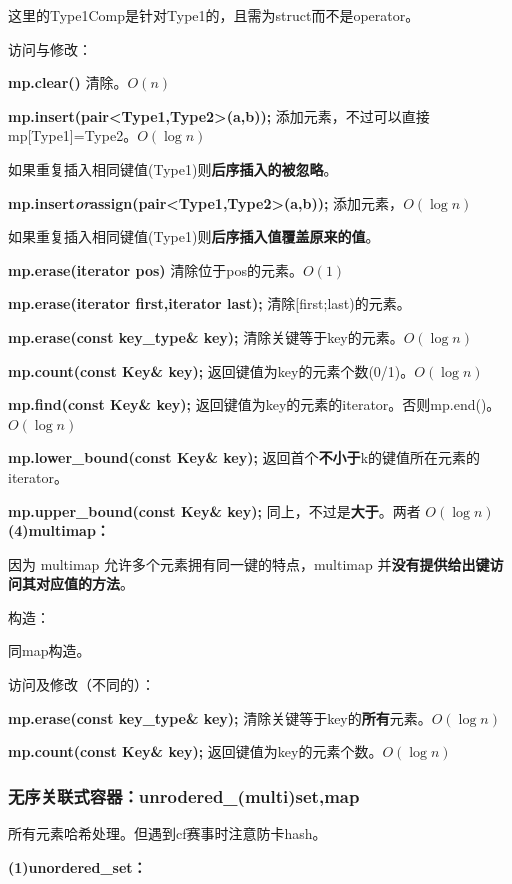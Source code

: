 \documentclass[a4paper,11pt]{article}
\begin{document}
这里的Type1Comp是针对Type1的，且需为struct而不是operator。

访问与修改：

\textbf{mp.clear()} 清除。\(O(n)\)

\textbf{mp.insert(pair\textless{}Type1,Type2\textgreater{}(a,b));
}添加元素，不过可以直接mp{[}Type1{]}=Type2。\(O(\log n)\)

如果重复插入相同键值(Type1)则\textbf{后序插入的被忽略}。

\textbf{mp.insert\emph{or}assign(pair\textless{}Type1,Type2\textgreater{}(a,b));}
添加元素，\(O(\log n)\)

如果重复插入相同键值(Type1)则\textbf{后序插入值覆盖原来的值}。

\textbf{mp.erase(iterator pos)} 清除位于pos的元素。\(O(1)\)

\textbf{mp.erase(iterator first,iterator last);
}清除{[}first;last)的元素。

\textbf{mp.erase(const key\_type\& key);}
清除关键等于key的元素。\(O(\log n)\)

\textbf{mp.count(const Key\& key);}
返回键值为key的元素个数(0/1)。\(O(\log n)\)

\textbf{mp.find(const Key\& key);}
返回键值为key的元素的iterator。否则mp.end()。\(O(\log n)\)

\textbf{mp.lower\_bound(const Key\& key);}
返回首个\textbf{不小于}k的键值所在元素的iterator。

\textbf{mp.upper\_bound(const Key\& key);}
同上，不过是\textbf{大于}。两者 \(O(\log n)\)
\noindent\textbf{(4)multimap：}

因为 multimap 允许多个元素拥有同一键的特点，multimap
并\textbf{没有提供给出键访问其对应值的方法}。

构造：

同map构造。

访问及修改（不同的）：

\textbf{mp.erase(const key\_type\& key);}
清除关键等于key的\textbf{所有}元素。\(O(\log n)\)

\textbf{mp.count(const Key\& key);}
返回键值为key的元素个数。\(O(\log n)\)

\subsubsection{无序关联式容器：unrodered\_(multi)set,map} 
所有元素哈希处理。但遇到cf赛事时注意防卡hash。

\noindent\textbf{(1)unordered\_set：}
\end{document}
